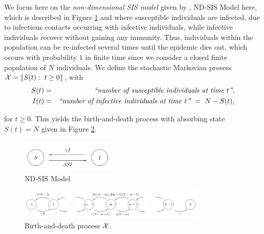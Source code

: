 \documentclass[10pt,A4paper]{article}
\begin{document}
\par We focus here on the {\it non-dimensional SIS model} given by \cite[Figure 1(b)]{Gomes04}, ND-SIS Model here, which is described in
Figure \ref{fig:1} and where susceptible individuals are infected, due to infectious contacts occurring with infective individuals, while infective individuals
recover without gaining any immunity. Thus, individuals within the population can be re-infected several times until the epidemic dies out, which occurs
with probability $1$ in finite time since we consider a closed finite population of $N$ individuals. We define the stochastic Markovian process ${\cal X}=\{S(t):\ t\geq0\}$, with
\begin{eqnarray*}
 S(t) &=& \hbox{\it ``number of susceptible individuals at time $t$''},\\
 I(t) &=& \hbox{\it ``number of infective individuals at time $t$''} \ = \ N-S(t),
\end{eqnarray*}

\par\noindent for $t\geq0$. This yields the birth-and-death process with absorbing state $S(t)=N$ given in Figure \ref{fig:2}.
\begin{figure}[h!]
\centering
 \includegraphics[width=0.4\textwidth]{Figure1.jpg}
\caption{ND-SIS Model}
\label{fig:1}
\end{figure}
\begin{figure}[h!]
\centering
 \includegraphics[width=0.8\textwidth]{Figure2.jpg}
\caption{Birth-and-death process ${\cal X}$.}
\label{fig:2}
\end{figure}
\end{document}
